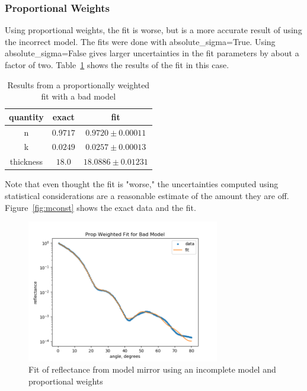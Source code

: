 \documentclass[english]{scrartcl}
\begin{document}
\subsubsection{Proportional Weights}
Using proportional weights, the fit is worse, but is a more
accurate result of using the incorrect model. The fits
were done with absolute\_sigma=True. Using
absolute\_sigma=False
gives larger uncertainties in the fit parameters by about
a factor of two.
Table~\ref{tab:mprop} shows the results of the fit
in this case.
\begin{table}[htb]
	\begin{center}
		\begin{tabular}{| c | c | c |}
			\hline
			quantity & exact & fit\\ \hline\hline
			n & $0.9717$ & $0.9720\pm 0.00011$\\
			k & $0.0249$ & $0.0257\pm 0.00013$\\
			thickness & $18.0$ & $18.0886\pm 0.01231$\\ \hline
		\end{tabular}
	\end{center}
	\caption{\label{tab:mprop}Results from a proportionally
		weighted fit with a bad model}
\end{table}
Note that even thought the fit is "worse," the uncertainties
computed using statistical considerations are a reasonable
estimate of the amount they are off.
Figure~\ref{fig:mconst} shows the exact data and the fit.
\begin{figure}[htb]
	\begin{center}
		\includegraphics[width=0.75\textwidth]{images/mprop}
	\end{center}
	\caption{\label{fig:mprop}Fit of reflectance from model mirror using an incomplete model and proportional weights}
\end{figure}
\end{document}
